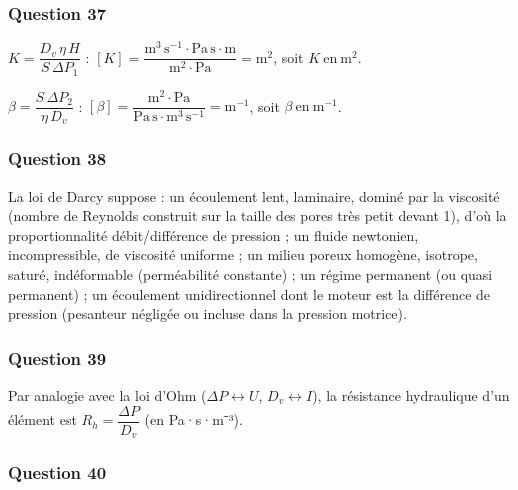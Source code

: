 \documentclass[11pt,a4paper]{article}
\newcommand{\equationajustee}[1]{%
  \sbox{\boiteequation}{$\displaystyle #1$}%
  \ifdim\wd\boiteequation>\linewidth
    \[\resizebox{\linewidth}{!}{\usebox{\boiteequation}}\]%
  \else
    \[#1\]%
  \fi}
\begin{document}
\hypertarget{question-37}{%
\subsubsection{Question 37}\label{question-37}}

\(K=\dfrac{D_v\,\eta\,H}{S\,\Delta P_1}\) : \([K]=\dfrac{\mathrm{m^3\,s^{-1}}\cdot\mathrm{Pa\,s}\cdot\mathrm m}{\mathrm{m^2}\cdot\mathrm{Pa}}=\mathrm m^2\), soit \(\boxed{K\ \text{en}\ \mathrm m^2}\).

\(\beta=\dfrac{S\,\Delta P_2}{\eta\,D_v}\) : \([\beta]=\dfrac{\mathrm m^2\cdot\mathrm{Pa}}{\mathrm{Pa\,s}\cdot\mathrm{m^3\,s^{-1}}}=\mathrm m^{-1}\), soit \(\boxed{\beta\ \text{en}\ \mathrm m^{-1}}\).

\hypertarget{question-38}{%
\subsubsection{Question 38}\label{question-38}}

La loi de Darcy suppose : un écoulement lent, laminaire, dominé par la viscosité (nombre de Reynolds construit sur la taille des pores très petit devant 1), d'où la proportionnalité débit/différence de pression ; un fluide newtonien, incompressible, de viscosité uniforme ; un milieu poreux homogène, isotrope, saturé, indéformable (perméabilité constante) ; un régime permanent (ou quasi permanent) ; un écoulement unidirectionnel dont le moteur est la différence de pression (pesanteur négligée ou incluse dans la pression motrice).

\hypertarget{question-39}{%
\subsubsection{Question 39}\label{question-39}}

Par analogie avec la loi d'Ohm (\(\Delta P\leftrightarrow U\), \(D_v\leftrightarrow I\)), la résistance hydraulique d'un élément est \(R_h=\dfrac{\Delta P}{D_v}\) (en Pa·s·m⁻³).

\equationajustee{\begin{aligned}
R_{h1}&=\frac{\Delta P_1}{D_v}\\
&=\boxed{\frac{\eta H}{KS}}\\
R_{h2}&=\frac{\Delta P_2}{D_v}\\
&=\boxed{\frac{\beta\eta}{S}}
\end{aligned}}

\hypertarget{question-40}{%
\subsubsection{Question 40}\label{question-40}}
\end{document}

